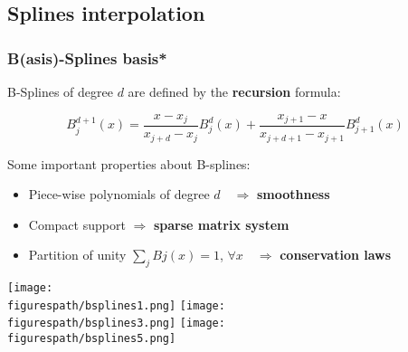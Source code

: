 \documentclass[10pt]{beamer}
\newcommand{\figurespath}{./figures}
\begin{document}
\subsection*{Splines interpolation}
\begin{frame}
	\frametitle{B(asis)-Splines basis*}

	B-Splines of degree $d$ are defined by the \textbf{recursion} formula:

	\begin{equation}
	B_j^{d+1}(x)= \dfrac{x - x_j}{x_{j+d}-x_j} B_j^d(x)+ \dfrac{x_{j+1} - x}{x_{j+d+1} - x_{j+1}} B_{j+1}^d (x)
	\end{equation}

	Some important properties about B-splines:

	\begin{itemize}
		\item Piece-wise polynomials of degree $d \quad \Rightarrow$ \textbf{smoothness}
		\item Compact support $\Rightarrow$ \textbf{sparse matrix system}
		\item Partition of unity $\sum_j Bj (x) = 1$, $\forall x \quad \Rightarrow$ \textbf{conservation laws}
	\end{itemize}

	\begin{center}
		\texttt{[image: \\figurespath/bsplines1.png]}
		\texttt{[image: \\figurespath/bsplines3.png]}
		\texttt{[image: \\figurespath/bsplines5.png]}
	\end{center}

\end{frame}
\end{document}
